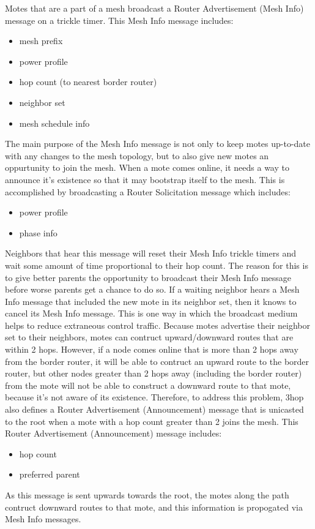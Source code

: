 Motes that are a part of a mesh broadcast a Router Advertisement (Mesh Info) message on a trickle timer. 
This Mesh Info message includes:
\begin{itemize}
\item mesh prefix
\item power profile
\item hop count (to nearest border router)
\item neighbor set
\item mesh schedule info
\end{itemize}
The main purpose of the Mesh Info message is not only to keep motes up-to-date with any changes to the mesh topology, but to also give new motes an oppurtunity to join the mesh.
When a mote comes online, it needs a way to announce it's existence so that it may bootstrap itself to the mesh. 
This is accomplished by broadcasting a Router Solicitation message which includes: 
\begin{itemize}
\item power profile
\item phase info
\end{itemize}
Neighbors that hear this message will reset their Mesh Info trickle timers and wait some amount of time proportional to their hop count. 
The reason for this is to give better parents the opportunity to broadcast their Mesh Info message before worse parents get a chance to do so.
If a waiting neighbor hears a Mesh Info message that included the new mote in its neighbor set, then it knows to cancel its Mesh Info message.
This is one way in which the broadcast medium helps to reduce extraneous control traffic.
Because motes advertise their neighbor set to their neighbors, motes can contruct upward/downward routes that are within 2 hops.
However, if a node comes online that is more than 2 hops away from the border router, it will be able to contruct an upward route to the border router, but other nodes greater than 2 hops away (including the border router) from the mote will not be able to construct a downward route to that mote, because it's not aware of its existence.
Therefore, to address this problem, 3hop also defines a Router Advertisement (Announcement) message that is unicasted to the root when a mote with a hop count greater than 2 joins the mesh.
This Router Advertisement (Announcement) message includes:
\begin{itemize}
\item hop count
\item preferred parent
\end{itemize}
As this message is sent upwards towards the root, the motes along the path contruct downward routes to that mote, and this information is propogated via Mesh Info messages.


